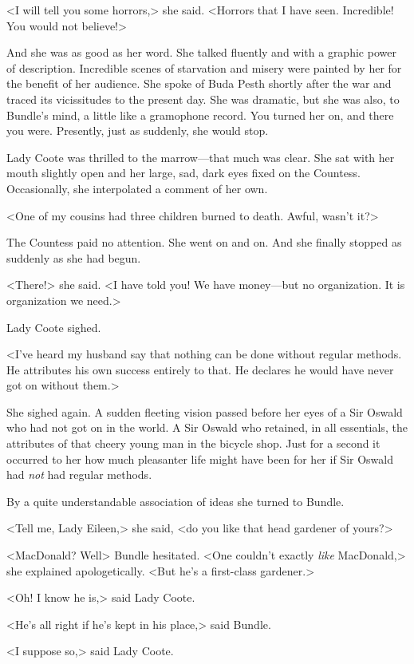 <I will tell you some horrors,> she said. <Horrors that I have seen. Incredible! You would not believe!>

And she was as good as her word. She talked fluently and with a graphic power of description. Incredible scenes of starvation and misery were painted by her for the benefit of her audience. She spoke of Buda Pesth shortly after the war and traced its vicissitudes to the present day. She was dramatic, but she was also, to Bundle's mind, a little like a gramophone record. You turned her on, and there you were. Presently, just as suddenly, she would stop.

Lady Coote was thrilled to the marrow—that much was clear. She sat with her mouth slightly open and her large, sad, dark eyes fixed on the Countess. Occasionally, she interpolated a comment of her own.

<One of my cousins had three children burned to death. Awful, wasn't it?>

The Countess paid no attention. She went on and on. And she finally stopped as suddenly as she had begun.

<There!> she said. <I have told you! We have money—but no organization. It is organization we need.>

Lady Coote sighed.

<I've heard my husband say that nothing can be done without regular methods. He attributes his own success entirely to that. He declares he would have never got on without them.>

She sighed again. A sudden fleeting vision passed before her eyes of a Sir Oswald who had not got on in the world. A Sir Oswald who retained, in all essentials, the attributes of that cheery young man in the bicycle shop. Just for a second it occurred to her how much pleasanter life might have been for her if Sir Oswald had \emph{not} had regular methods.

By a quite understandable association of ideas she turned to Bundle.

<Tell me, Lady Eileen,> she said, <do you like that head gardener of yours?>

<MacDonald? Well\longdash> Bundle hesitated. <One couldn't exactly \emph{like} MacDonald,> she explained apologetically. <But he's a first-class gardener.>

<Oh! I know he is,> said Lady Coote.

<He's all right if he's kept in his place,> said Bundle.

<I suppose so,> said Lady Coote.

